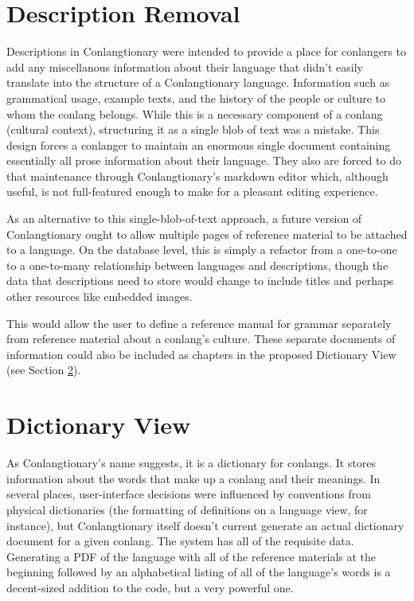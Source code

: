 \section{Description Removal}
\label{sec:refactor-description}

Descriptions in Conlangtionary were intended to provide a place for conlangers to add any miscellanous information about their language that didn't easily translate into the structure of a Conlangtionary language. Information such as grammatical usage, example texts, and the history of the people or culture to whom the conlang belongs. While this is a necessary component of a conlang (cultural context), structuring it as a single blob of text was a mistake. This design forces a conlanger to maintain an enormous single document containing essentially all prose information about their language. They also are forced to do that maintenance through Conlangtionary's markdown editor which, although useful, is not full-featured enough to make for a pleasant editing experience.

As an alternative to this single-blob-of-text approach, a future version of Conlangtionary ought to allow multiple pages of reference material to be attached to a language. On the database level, this is simply a refactor from a one-to-one to a one-to-many relationship between languages and descriptions, though the data that descriptions need to store would change to include titles and perhaps other resources like embedded images.

This would allow the user to define a reference manual for grammar separately from reference material about a conlang's culture. These separate documents of information could also be included as chapters in the proposed Dictionary View (see Section \ref{sec:refactor-dictionary}).

\section{Dictionary View}
\label{sec:refactor-dictionary}

As Conlangtionary's name suggests, it is a dictionary for conlangs. It stores information about the words that make up a conlang and their meanings. In several places, user-interface decisions were influenced by conventions from physical dictionaries (the formatting of definitions on a language view, for instance), but Conlangtionary itself doesn't current generate an actual dictionary document for a given conlang. The system has all of the requisite data. Generating a PDF of the language with all of the reference materials at the beginning followed by an alphabetical listing of all of the language's words is a decent-sized addition to the code, but a very powerful one.

